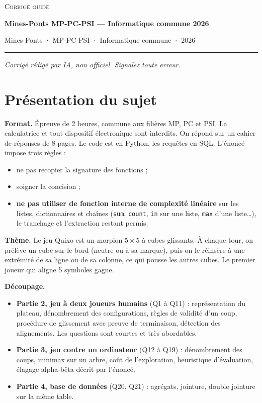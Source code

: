 \documentclass[11pt,a4paper]{article}
\providecommand{\tightlist}{\setlength{\itemsep}{0pt}\setlength{\parskip}{0pt}}
\begin{document}
\thispagestyle{plain}
\begin{center}
  {\small\scshape Corrigé guidé}\par\smallskip
  {\LARGE\bfseries Mines-Ponts MP-PC-PSI — Informatique commune 2026\par}\medskip
  {\large Mines-Ponts · MP-PC-PSI · Informatique commune · 2026\par}
\end{center}
\vspace{2pt}\hrule\vspace{8pt}

\emph{Corrigé rédigé par IA, non officiel. Signalez toute erreur.}

\hypertarget{pruxe9sentation-du-sujet}{%
\section{Présentation du sujet}\label{pruxe9sentation-du-sujet}}

\textbf{Format.} Épreuve de 2 heures, commune aux filières MP, PC et PSI. La calculatrice et tout dispositif électronique sont interdits. On répond sur un cahier de réponses de 8 pages. Le code est en Python, les requêtes en SQL. L'énoncé impose trois règles :

\begin{itemize}
\tightlist
\item
  ne pas recopier la signature des fonctions ;
\item
  soigner la concision ;
\item
  \textbf{ne pas utiliser de fonction interne de complexité linéaire} sur les listes, dictionnaires et chaînes (\texttt{sum}, \texttt{count}, \texttt{in} sur une liste, \texttt{max} d'une liste\ldots), le tranchage et l'extraction restant permis.
\end{itemize}

\textbf{Thème.} Le jeu Quixo est un morpion \(5\times5\) à cubes glissants. À chaque tour, on prélève un cube sur le bord (neutre ou à sa marque), puis on le réinsère à une extrémité de sa ligne ou de sa colonne, ce qui pousse les autres cubes. Le premier joueur qui aligne 5 symboles gagne.

\textbf{Découpage.}

\begin{itemize}
\tightlist
\item
  \textbf{Partie 2, jeu à deux joueurs humains} (Q1 à Q11) : représentation du plateau, dénombrement des configurations, règles de validité d'un coup, procédure de glissement avec preuve de terminaison, détection des alignements. Les questions sont courtes et très abordables.
\item
  \textbf{Partie 3, jeu contre un ordinateur} (Q12 à Q19) : dénombrement des coups, minimax sur un arbre, coût de l'exploration, heuristique d'évaluation, élagage alpha-bêta décrit par l'énoncé.
\item
  \textbf{Partie 4, base de données} (Q20, Q21) : agrégats, jointure, double jointure sur la même table.
\end{itemize}
\end{document}
